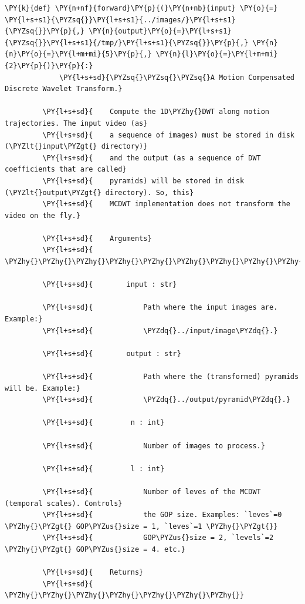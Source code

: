 {\begin{Verbatim}[commandchars=\\\{\}]
         \PY{k}{def} \PY{n+nf}{forward}\PY{p}{(}\PY{n+nb}{input} \PY{o}{=} \PY{l+s+s1}{\PYZsq{}}\PY{l+s+s1}{../images/}\PY{l+s+s1}{\PYZsq{}}\PY{p}{,} \PY{n}{output}\PY{o}{=}\PY{l+s+s1}{\PYZsq{}}\PY{l+s+s1}{/tmp/}\PY{l+s+s1}{\PYZsq{}}\PY{p}{,} \PY{n}{n}\PY{o}{=}\PY{l+m+mi}{5}\PY{p}{,} \PY{n}{l}\PY{o}{=}\PY{l+m+mi}{2}\PY{p}{)}\PY{p}{:}
             \PY{l+s+sd}{\PYZsq{}\PYZsq{}\PYZsq{}A Motion Compensated Discrete Wavelet Transform.}
         
         \PY{l+s+sd}{    Compute the 1D\PYZhy{}DWT along motion trajectories. The input video (as}
         \PY{l+s+sd}{    a sequence of images) must be stored in disk (\PYZlt{}input\PYZgt{} directory)}
         \PY{l+s+sd}{    and the output (as a sequence of DWT coefficients that are called}
         \PY{l+s+sd}{    pyramids) will be stored in disk (\PYZlt{}output\PYZgt{} directory). So, this}
         \PY{l+s+sd}{    MCDWT implementation does not transform the video on the fly.}
         
         \PY{l+s+sd}{    Arguments}
         \PY{l+s+sd}{    \PYZhy{}\PYZhy{}\PYZhy{}\PYZhy{}\PYZhy{}\PYZhy{}\PYZhy{}\PYZhy{}\PYZhy{}}
         
         \PY{l+s+sd}{        input : str}
         
         \PY{l+s+sd}{            Path where the input images are. Example:}
         \PY{l+s+sd}{            \PYZdq{}../input/image\PYZdq{}.}
         
         \PY{l+s+sd}{        output : str}
         
         \PY{l+s+sd}{            Path where the (transformed) pyramids will be. Example:}
         \PY{l+s+sd}{            \PYZdq{}../output/pyramid\PYZdq{}.}
         
         \PY{l+s+sd}{         n : int}
         
         \PY{l+s+sd}{            Number of images to process.}
         
         \PY{l+s+sd}{         l : int}
         
         \PY{l+s+sd}{            Number of leves of the MCDWT (temporal scales). Controls}
         \PY{l+s+sd}{            the GOP size. Examples: `leves`=0 \PYZhy{}\PYZgt{} GOP\PYZus{}size = 1, `leves`=1 \PYZhy{}\PYZgt{}}
         \PY{l+s+sd}{            GOP\PYZus{}size = 2, `levels`=2 \PYZhy{}\PYZgt{} GOP\PYZus{}size = 4. etc.}
         
         \PY{l+s+sd}{    Returns}
         \PY{l+s+sd}{    \PYZhy{}\PYZhy{}\PYZhy{}\PYZhy{}\PYZhy{}\PYZhy{}\PYZhy{}}
         

\end{Verbatim}}
